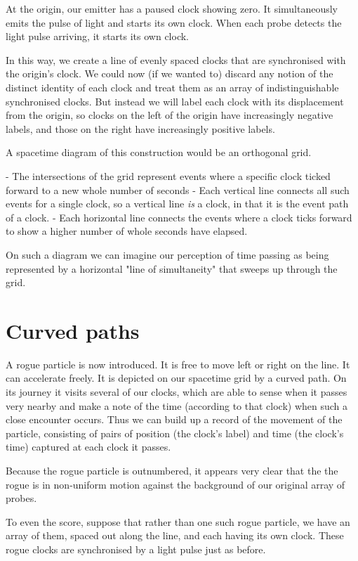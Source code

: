 At the origin, our emitter has a paused clock showing zero. It simultaneously emits the pulse of light and starts its own clock. When each probe detects the light pulse arriving, it starts its own clock.

In this way, we create a line of evenly spaced clocks that are synchronised with the origin's clock. We could now (if we wanted to) discard any notion of the distinct identity of each clock and treat them as an array of indistinguishable synchronised clocks. But instead we will label each clock with its displacement from the origin, so clocks on the left of the origin have increasingly negative labels, and those on the right have increasingly positive labels.

A spacetime diagram of this construction would be an orthogonal grid.

-   The intersections of the grid represent events where a specific clock ticked forward to a new whole number of seconds
-   Each vertical line connects all such events for a single clock, so a vertical line \textit{is} a clock, in that it is the event path of a clock.
-   Each horizontal line connects the events where a clock ticks forward to show a higher number of whole seconds have elapsed.

On such a diagram we can imagine our perception of time passing as being represented by a horizontal "line of simultaneity" that sweeps up through the grid.

\section{Curved paths}

A rogue particle is now introduced. It is free to move left or right on the line. It can accelerate freely. It is depicted on our spacetime grid by a curved path. On its journey it visits several of our clocks, which are able to sense when it passes very nearby and make a note of the time (according to that clock) when such a close encounter occurs. Thus we can build up a record of the movement of the particle, consisting of pairs of position (the clock's label) and time (the clock's time) captured at each clock it passes.

Because the rogue particle is outnumbered, it appears very clear that the the rogue is in non-uniform motion against the background of our original array of probes.

To even the score, suppose that rather than one such rogue particle, we have an array of them, spaced out along the line, and each having its own clock. These rogue clocks are synchronised by a light pulse just as before.

